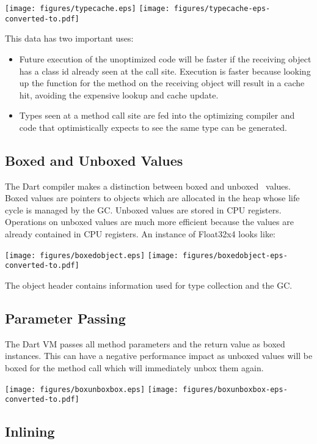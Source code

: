 \documentclass[preprint]{sigplanconf}
\begin{document}
\ifx\pdfoutput\undefined
\texttt{[image: figures/typecache.eps]}
\else
\texttt{[image: figures/typecache-eps-converted-to.pdf]}
\fi

This data has two important uses:
\begin{itemize}
\item
Future execution of the unoptimized code will be faster if the receiving object
has a class id already seen at the call site. Execution is faster because
looking up the function for the method on the receiving object will result in a
cache hit, avoiding the expensive lookup and cache update.

\item
Types seen at a method call site are fed into the optimizing compiler and code
that optimistically expects to see the same type can be generated.
\end{itemize}

\subsection{Boxed and Unboxed Values}
\label{boxing}

The Dart compiler makes a distinction between boxed and  unboxed~\cite{unboxing}
values. Boxed values are pointers to objects which are allocated in the heap
whose life cycle is managed by the GC. Unboxed values are stored in CPU
registers. Operations on unboxed values are much more efficient because the
values are already contained in CPU registers. An instance of Float32x4 looks
like:

\ifx\pdfoutput\undefined
\texttt{[image: figures/boxedobject.eps]}
\else
\texttt{[image: figures/boxedobject-eps-converted-to.pdf]}
\fi

The object header contains information used for type collection and the GC.

\subsection{Parameter Passing}

The Dart VM passes all method parameters and the return value as boxed
instances. This can have a negative performance impact as unboxed values will be
boxed for the method call which will immediately unbox them again.

\ifx\pdfoutput\undefined
\texttt{[image: figures/boxunboxbox.eps]}
\else
\texttt{[image: figures/boxunboxbox-eps-converted-to.pdf]}
\fi

\subsection{Inlining}
\label{inlining}
\end{document}
